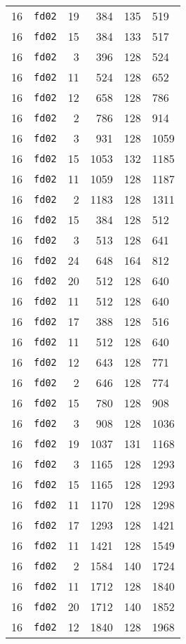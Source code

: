 \documentclass{article}
\begin{document}
\begin{table}[h!]
\begin{tabular}{llrrrl}
    16 & \texttt{fd02} & 19 & 384 & 135 & 519 \\
    16 & \texttt{fd02} & 15 & 384 & 133 & 517 \\
    16 & \texttt{fd02} & 3 & 396 & 128 & 524 \\
    16 & \texttt{fd02} & 11 & 524 & 128 & 652 \\
    16 & \texttt{fd02} & 12 & 658 & 128 & 786 \\
    16 & \texttt{fd02} & 2 & 786 & 128 & 914 \\
    16 & \texttt{fd02} & 3 & 931 & 128 & 1059 \\
    16 & \texttt{fd02} & 15 & 1053 & 132 & 1185 \\
    16 & \texttt{fd02} & 11 & 1059 & 128 & 1187 \\
    16 & \texttt{fd02} & 2 & 1183 & 128 & 1311 \\
    16 & \texttt{fd02} & 15 & 384 & 128 & 512 \\
    16 & \texttt{fd02} & 3 & 513 & 128 & 641 \\
    16 & \texttt{fd02} & 24 & 648 & 164 & 812 \\
    16 & \texttt{fd02} & 20 & 512 & 128 & 640 \\
    16 & \texttt{fd02} & 11 & 512 & 128 & 640 \\
    16 & \texttt{fd02} & 17 & 388 & 128 & 516 \\
    16 & \texttt{fd02} & 11 & 512 & 128 & 640 \\
    16 & \texttt{fd02} & 12 & 643 & 128 & 771 \\
    16 & \texttt{fd02} & 2 & 646 & 128 & 774 \\
    16 & \texttt{fd02} & 15 & 780 & 128 & 908 \\
    16 & \texttt{fd02} & 3 & 908 & 128 & 1036 \\
    16 & \texttt{fd02} & 19 & 1037 & 131 & 1168 \\
    16 & \texttt{fd02} & 3 & 1165 & 128 & 1293 \\
    16 & \texttt{fd02} & 15 & 1165 & 128 & 1293 \\
    16 & \texttt{fd02} & 11 & 1170 & 128 & 1298 \\
    16 & \texttt{fd02} & 17 & 1293 & 128 & 1421 \\
    16 & \texttt{fd02} & 11 & 1421 & 128 & 1549 \\
    16 & \texttt{fd02} & 2 & 1584 & 140 & 1724 \\
    16 & \texttt{fd02} & 11 & 1712 & 128 & 1840 \\
    16 & \texttt{fd02} & 20 & 1712 & 140 & 1852 \\
    16 & \texttt{fd02} & 12 & 1840 & 128 & 1968 \\

    \bottomrule
  \end{tabular}
\end{table}
\end{document}
